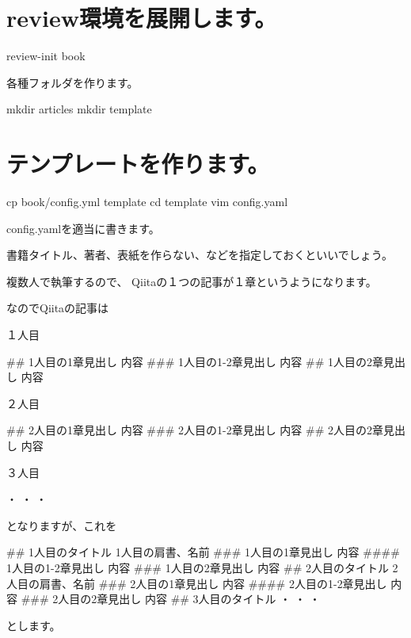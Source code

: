 \section{review環境を展開します。}
\label{sec:6-4}

review{-}init book

各種フォルダを作ります。

mkdir articles
mkdir template

\section{テンプレートを作ります。}
\label{sec:6-5}

\begin{reviewemlist}
cp book/config.yml template
cd template
vim config.yaml
\end{reviewemlist}

config.yamlを適当に書きます。

書籍タイトル、著者、表紙を作らない、などを指定しておくといいでしょう。

複数人で執筆するので、
Qiitaの１つの記事が１章というようになります。

なのでQiitaの記事は

１人目

\begin{reviewemlist}
\#\# 1人目の1章見出し
内容
\#\#\# 1人目の1{-}2章見出し
内容
\#\# 1人目の2章見出し
内容
\end{reviewemlist}

２人目

\begin{reviewemlist}
\#\# 2人目の1章見出し
内容
\#\#\# 2人目の1{-}2章見出し
内容
\#\# 2人目の2章見出し
内容
\end{reviewemlist}

３人目

\begin{reviewemlist}
・
・
・
\end{reviewemlist}

となりますが、これを

\begin{reviewemlist}
\#\# 1人目のタイトル
1人目の肩書、名前
\#\#\# 1人目の1章見出し
内容
\#\#\#\# 1人目の1{-}2章見出し
内容
\#\#\# 1人目の2章見出し
内容
\#\# 2人目のタイトル
2人目の肩書、名前
\#\#\# 2人目の1章見出し
内容
\#\#\#\# 2人目の1{-}2章見出し
内容
\#\#\# 2人目の2章見出し
内容
\#\# 3人目のタイトル
・
・
・
\end{reviewemlist}

とします。

